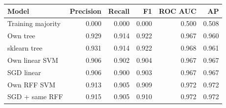 \begin{tabular}{@{}lrrrrr@{}}
\toprule
Model & Precision & Recall & F1 & ROC AUC & AP \\
\midrule
Training majority & 0.000 & 0.000 & 0.000 & 0.500 & 0.508 \\
Own tree & 0.929 & 0.914 & 0.922 & 0.967 & 0.960 \\
sklearn tree & 0.931 & 0.914 & 0.922 & 0.968 & 0.961 \\
Own linear SVM & 0.906 & 0.902 & 0.904 & 0.967 & 0.967 \\
SGD linear & 0.906 & 0.900 & 0.903 & 0.967 & 0.967 \\
Own RFF SVM & 0.913 & 0.905 & 0.909 & 0.972 & 0.972 \\
SGD + same RFF & 0.915 & 0.905 & 0.910 & 0.972 & 0.972 \\
\bottomrule
\end{tabular}
